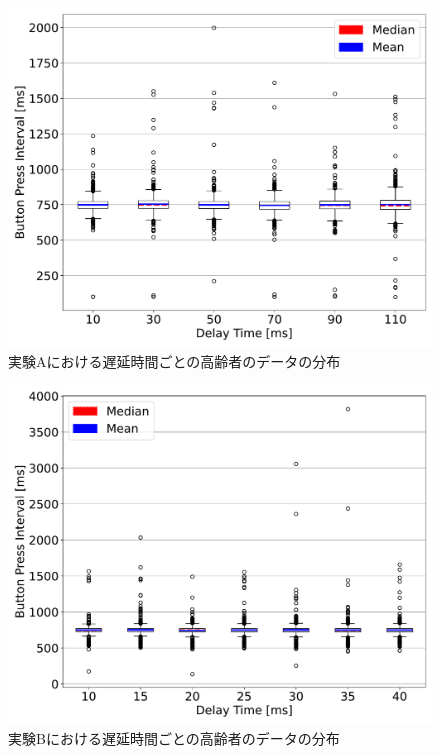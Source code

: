 \begin{figure}[tbp]
  \centering
  \includegraphics[scale=0.4]{figures/Honbann/BOXPLOT/old_110_boxplot.pdf}
  \caption{実験Aにおける遅延時間ごとの高齢者のデータの分布}
  \label{fig:110ms_Distribution_of_observations_by_old}
\end{figure}
\begin{figure}[tbp]
  \centering
  \includegraphics[scale=0.4]{figures/Honbann/BOXPLOT/old_40_boxplot.pdf}
  \caption{実験Bにおける遅延時間ごとの高齢者のデータの分布}
  \label{fig:40ms_Distribution_of_observations_by_old}
\end{figure}
\newpage
